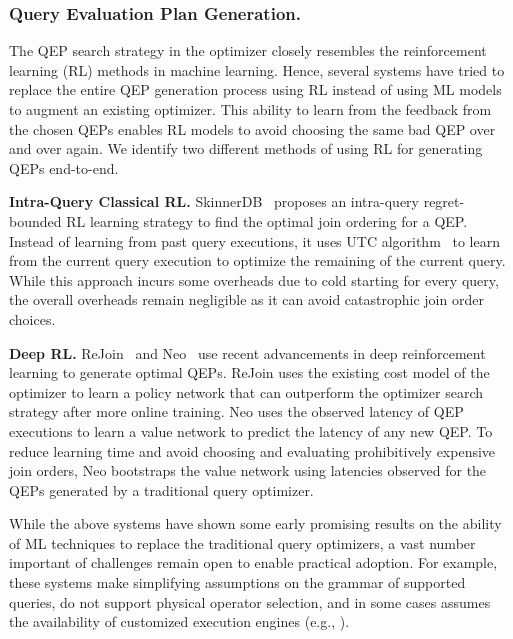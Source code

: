 \subsubsection{Query Evaluation Plan Generation.} The QEP search strategy in the optimizer closely resembles the reinforcement learning (RL) methods in machine learning.
Hence, several systems have tried to replace the entire QEP generation process using RL instead of using ML models to augment an existing optimizer.
This ability to learn from the feedback from the chosen QEPs enables RL models to avoid choosing the same bad QEP over and over again.
We identify two different methods of using RL for generating QEPs end-to-end.

\vspace{2mm}
\noindent \textbf{Intra-Query Classical RL.} SkinnerDB~\cite{skinnerdb} proposes an intra-query regret-bounded RL learning strategy to find the optimal join ordering for a QEP.
Instead of learning from past query executions, it uses UTC algorithm~\cite{utc} to learn from the current query execution to optimize the remaining of the current query.
While this approach incurs some overheads due to cold starting for every query, the overall overheads remain negligible as it can avoid catastrophic join order choices.

\vspace{2mm}
\noindent \textbf{Deep RL.} ReJoin~\cite{rejoin} and Neo~\cite{neo} use recent advancements in deep reinforcement learning to generate optimal QEPs.
ReJoin uses the existing cost model of the optimizer to learn a policy network that can outperform the optimizer search strategy after more online training.
Neo uses the observed latency of QEP executions to learn a value network to predict the latency of any new QEP.
To reduce learning time and avoid choosing and evaluating prohibitively expensive join orders, Neo bootstraps the value network using latencies observed for the QEPs generated by a traditional query optimizer.

\vspace{2mm}
While the above systems have shown some early promising results on the ability of ML techniques to replace the traditional query optimizers, a vast number important of challenges remain open to enable practical adoption.
For example, these systems make simplifying assumptions on the grammar of supported queries, do not support physical operator selection, and in some cases assumes the availability of customized execution engines (e.g., \cite{skinnerdb}).



